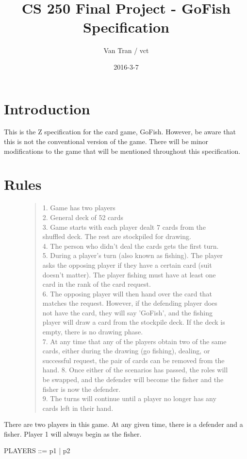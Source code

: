 \documentclass{article}
\title{CS 250 Final Project - GoFish Specification}
\author{Van Tran / vct}
\date{2016-3-7}
\begin{document}
\maketitle

\section*{Introduction}
This is the Z specification for the card game, GoFish.
However, be aware that this is not the conventional version
of the game. There will be minor modifications to the game
that will be mentioned throughout this specification.

\section*{Rules}
\begin{figure}[h]
\begin{quotation}
1. Game has two players \\
2. General deck of 52 cards\\
3. Game starts with each player dealt 7 cards from the
shuffled deck. The rest are stockpiled for drawing. \\
4. The person who didn't deal the cards gets the first turn. \\
5. During a player's turn (also known as fishing). The player
asks the opposing player if they have a certain card (suit doesn't matter).
The player fishing must have at least one card in the rank of the card request.\\
6. The opposing player will then hand over the card that matches
the request. However, if the defending player does not have the card,
they will say 'GoFish', and the fishing player will draw a card
from the stockpile deck. If the deck is empty, there is no drawing phase.\\
7. At any time that any of the players obtain two of the same cards,
either during the drawing (go fishing), dealing, or successful request,
the pair of cards can be removed from the hand.
8. Once either of the scenarios has passed, the roles will be swapped,
and the defender will become the fisher and the fisher is now the defender.\\
9. The turns will continue until a player no longer has any cards left
in their hand.\\
\end{quotation}
\end{figure}

There are two players in this game. At any given time, there is a
defender and a fisher. Player 1 will always begin as the fisher.
\begin{zed} 
    PLAYERS ::= p1 | p2\\
\end{zed}
\end{document}
